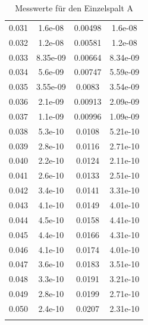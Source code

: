 \documentclass[11pt,ngerman,a4paper]{article}
\begin{document}
\begin{longtable}{SSSS}
0.031 & 1.6e-08 & 0.00498 & 1.6e-08\\
0.032 & 1.2e-08 & 0.00581 & 1.2e-08\\
0.033 & 8.35e-09 & 0.00664 & 8.34e-09\\
0.034 & 5.6e-09 & 0.00747 & 5.59e-09\\
0.035 & 3.55e-09 & 0.0083 & 3.54e-09\\
0.036 & 2.1e-09 & 0.00913 & 2.09e-09\\
0.037 & 1.1e-09 & 0.00996 & 1.09e-09\\
0.038 & 5.3e-10 & 0.0108 & 5.21e-10\\
0.039 & 2.8e-10 & 0.0116 & 2.71e-10\\
0.040 & 2.2e-10 & 0.0124 & 2.11e-10\\
0.041 & 2.6e-10 & 0.0133 & 2.51e-10\\
0.042 & 3.4e-10 & 0.0141 & 3.31e-10\\
0.043 & 4.1e-10 & 0.0149 & 4.01e-10\\
0.044 & 4.5e-10 & 0.0158 & 4.41e-10\\
0.045 & 4.4e-10 & 0.0166 & 4.31e-10\\
0.046 & 4.1e-10 & 0.0174 & 4.01e-10\\
0.047 & 3.6e-10 & 0.0183 & 3.51e-10\\
0.048 & 3.3e-10 & 0.0191 & 3.21e-10\\
0.049 & 2.8e-10 & 0.0199 & 2.71e-10\\
0.050 & 2.4e-10 & 0.0207 & 2.31e-10\\
\bottomrule
\caption{Messwerte für den Einzelspalt A}
\end{longtable}
\end{document}
